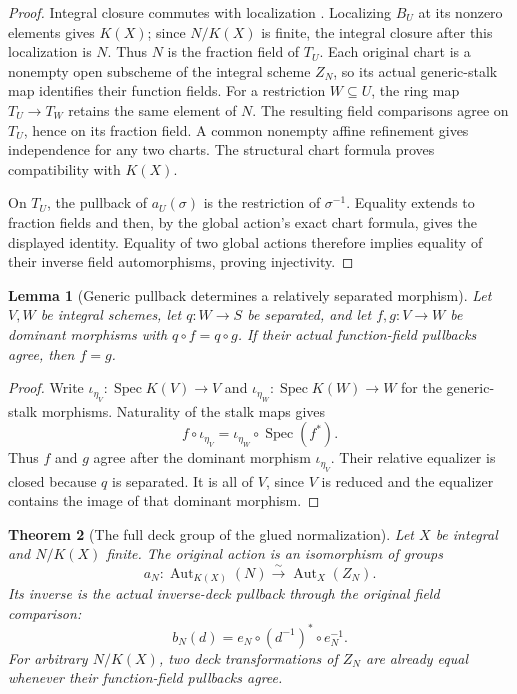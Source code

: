 \documentclass[11pt]{article}
\newtheorem{theorem}{Theorem}[section]
\newtheorem{lemma}[theorem]{Lemma}
\theoremstyle{definition}
\theoremstyle{remark}
\DeclareMathOperator{\Spec}{Spec}
\begin{document}
\begin{proof}
Integral closure commutes with localization
\cite{StacksIntegralClosureLocalization}. Localizing \(B_U\) at its
nonzero elements gives \(K(X)\); since \(N/K(X)\) is finite, the integral
closure after this localization is \(N\). Thus \(N\) is the fraction
field of \(T_U\). Each original chart is a nonempty open subscheme of
the integral scheme \(Z_N\), so its actual generic-stalk map identifies
their function fields. For a restriction \(W\subseteq U\), the ring map
\(T_U\to T_W\) retains the same element of \(N\). The resulting field
comparisons agree on \(T_U\), hence on its fraction field. A common
nonempty affine refinement gives independence for any two charts.
The structural chart formula proves compatibility with \(K(X)\).

On \(T_U\), the pullback of \(a_U(\sigma)\) is the restriction of
\(\sigma^{-1}\). Equality extends to fraction fields and then, by the
global action's exact chart formula, gives the displayed identity.
Equality of two global actions therefore implies equality of their
inverse field automorphisms, proving injectivity.
\end{proof}

\begin{lemma}[Generic pullback determines a relatively separated morphism]
\label{lem:generic-pullback-extensionality}
Let \(V,W\) be integral schemes, let \(q:W\to S\) be separated, and
let \(f,g:V\to W\) be dominant morphisms with \(q\circ f=q\circ g\).
If their actual function-field pullbacks agree, then \(f=g\).
\end{lemma}

\begin{proof}
Write \(\iota_{\eta_V}:\Spec K(V)\to V\) and
\(\iota_{\eta_W}:\Spec K(W)\to W\) for the generic-stalk morphisms.
Naturality of the stalk maps gives
\[
 f\circ\iota_{\eta_V}=\iota_{\eta_W}\circ\Spec(f^*).
\]
Thus \(f\) and \(g\) agree after the dominant morphism \(\iota_{\eta_V}\).
Their relative equalizer is closed because \(q\) is separated.
It is all of \(V\), since \(V\) is reduced and the equalizer contains
the image of that dominant morphism.
\end{proof}

\begin{theorem}[The full deck group of the glued normalization]
\label{thm:normalization-full-deck-group}
Let \(X\) be integral and \(N/K(X)\) finite. The original action is
an isomorphism of groups
\[
 a_N:\operatorname{Aut}_{K(X)}(N)
       \xrightarrow{\sim}\operatorname{Aut}_X(Z_N).
\]
Its inverse is the actual inverse-deck pullback through the original
field comparison:
\[
 b_N(d)=e_N\circ(d^{-1})^*\circ e_N^{-1}.
\]
For arbitrary \(N/K(X)\), two deck transformations of \(Z_N\) are
already equal whenever their function-field pullbacks agree.
\end{theorem}
\end{document}
